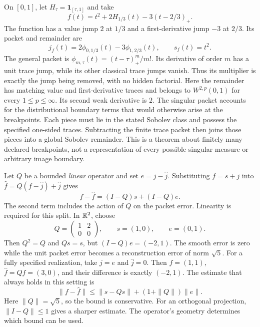 On $[0,1]$, let $H_\tau=\mathbf1_{[\tau,1]}$ and take
\[
f(t)=t^2+2H_{1/3}(t)-3(t-2/3)_+.
\]
The function has a value jump $2$ at $1/3$ and a first-derivative jump $-3$ at $2/3$. Its packet and remainder are
\[
j_f(t)=2\phi_{0,1/3}(t)-3\phi_{1,2/3}(t),\qquad s_f(t)=t^2.
\]
The general packet is $\phi_{m,\tau}(t)=(t-\tau)_+^m/m!$. Its derivative of order $m$ has a unit trace jump, while its other classical trace jumps vanish. Thus its multiplier is exactly the jump being removed, with no hidden factorial.
Here the remainder has matching value and first-derivative traces and belongs to $W^{2,p}(0,1)$ for every $1\le p\le\infty$. Its second weak derivative is $2$. The singular packet accounts for the distributional boundary terms that would otherwise arise at the breakpoints.
Each piece must lie in the stated Sobolev class and possess the specified one-sided traces. Subtracting the finite trace packet then joins those pieces into a global Sobolev remainder. This is a theorem about finitely many declared breakpoints, not a representation of every possible singular measure or arbitrary image boundary.

Let $Q$ be a bounded \emph{linear} operator and set $e=j-\widehat j$. Substituting $f=s+j$ into $\widehat f=Q(f-\widehat j)+\widehat j$ gives
\[
f-\widehat f=(I-Q)s+(I-Q)e.
\]
The second term includes the action of $Q$ on the packet error. Linearity is required for this split.
In $\mathbb R^2$, choose
\[
Q=\begin{pmatrix}1&2\\0&0\end{pmatrix},\qquad
s=(1,0),\qquad e=(0,1).
\]
Then $Q^2=Q$ and $Qs=s$, but $(I-Q)e=(-2,1)$. The smooth error is zero while the unit packet error becomes a reconstruction error of norm $\sqrt5$.
For a fully specified realization, take $j=e$ and $\widehat j=0$. Then $f=(1,1)$, $\widehat f=Qf=(3,0)$, and their difference is exactly $(-2,1)$.
The estimate that always holds in this setting is
\[
\|f-\widehat f\|\leq\|s-Qs\|+(1+\|Q\|)\|e\|.
\]
Here $\|Q\|=\sqrt5$, so the bound is conservative. For an orthogonal projection, $\|I-Q\|\le1$ gives a sharper estimate. The operator's geometry determines which bound can be used.

